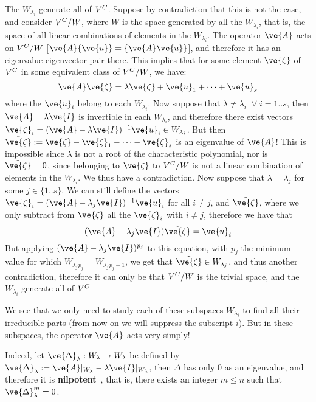 The $W_{\lambda_i}$ generate all of $V^{C}$. Suppose by contradiction that this
is not the case, and consider $V^{C}/W$, where $W$ is the space generated by all
the $W_{\lambda_i}$, that is, the space of all linear combinations of 
elements in the $W_{\lambda_i}$. The operator $\ve{A}$ acts on $V^{C}/W$
[$\ve{A}\{\ve{u}\} = \{\ve{A}\ve{u}\}$], and therefore it has an eigenvalue-eigenvector pair there. This implies that for some element $\ve{\zeta}$ of $V^{C}$ 
in some equivalent class of $V^{C}/W$, we have:
\begin{equation}
  \ve{A}\ve{\zeta} = \lambda \ve{\zeta} + \ve{u}_1 + \dots + \ve{u}_s
\end{equation}
%
where the $\ve{u}_i$ belong to each $W_{\lambda_i}$.
Now suppose that $\lambda \neq \lambda_i\;\; \forall\; i=1..s$, then 
$\ve{A} - \lambda\ve{I}$ is invertible in each $W_{\lambda_i}$, and therefore there exist vectors 
$\ve{\zeta}_i = (\ve{A} - \lambda\ve{I})^{-1} \ve{u}_i \in W_{\lambda_i}$.
But then 
$\tilde{\ve{\zeta}} := \ve{\zeta} - \ve{\zeta}_1 - \dots - \ve{\zeta}_s$
is an eigenvalue of $\ve{A}$! 
This is impossible since $\lambda$ is not a root of
the characteristic polynomial, nor is $\tilde{\ve{\zeta}}=0$, since 
belonging to $\ve{\zeta}$ to $V^{C}/W$ is not
a linear combination of elements in the $W_{\lambda_i}$.
We thus have a contradiction.
Now suppose that $\lambda = \lambda_j$ for some $j \in \{1..s\}$.
We can still define the vectors 
$\ve{\zeta}_i =(\ve{A} - \lambda_j\ve{I})^{-1} \ve{u}_i$ for all $i\neq j$, and
$\tilde{\ve{\zeta}}$, where we only subtract from $\ve{\zeta}$ all the 
$\ve{\zeta}_i$ with $i\neq j$,
therefore we have that 
\begin{equation}
  (\ve{A} - \lambda_j\ve{I})\tilde{\ve{\zeta}} = \ve{u}_i
\end{equation}
But applying $(\ve{A} - \lambda_j\ve{I})^{p_j}$ to this equation, with
$p_j$ the minimum value for which $W_{\lambda_j}{}_{p_j} = W_{\lambda_j}{}_{p_j+1}$, 
we get that $\tilde{\ve{\zeta}} \in W_{\lambda_j}$, and thus another contradiction,
therefore it can only be that $V^{C}/W$ is the trivial space, and the $W_{\lambda_i}$
generate all of $V^{C}$
\epru
\espa

We see that we only need to study each of these subspaces
$W_{\lambda_i}$ to find all their irreducible parts (from now on
we will suppress the subscript $i$).
But in these subspaces, the operator
$\ve{A}$ acts very simply!

Indeed, let $\ve{\Delta}_{\lambda}: W_{\lambda} \to W_{\lambda}$ 
be defined by  
$\ve{\Delta}_{\lambda}:= \ve{A}|_{W_{\lambda}} - \lambda \ve{I}|_{W_{\lambda}}$, 
then $\Delta$ has only $0$ as an eigenvalue, and therefore it is 
\textbf{nilpotent}~, that is, there exists an integer $m \leq n$
such that $\ve{\Delta}_{\lambda}^m =0$.
\espa

